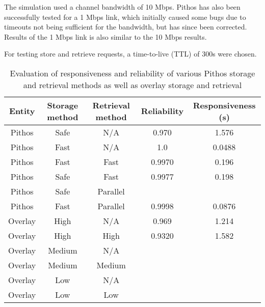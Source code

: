 The simulation used a channel bandwidth of 10 Mbps. Pithos has also been successfully tested for a 1 Mbps link, which initially caused some bugs due to timeouts not being sufficient for the bandwidth, but has since been corrected. Results of the 1 Mbps link is also similar to the 10 Mbps results.

For testing store and retrieve requests, a time-to-live (TTL) of 300s were chosen.

\begin{table}[htbp]
\centering
\begin{tabular}{|c|c|c|c|c|}
\hline
Entity & Storage method & Retrieval method & Reliability & Responsiveness (s)\\
\hline
Pithos  &   Safe    &   N/A         &   0.970   &   1.576\\
Pithos  &   Fast    &   N/A         &   1.0     &   0.0488\\
Pithos  &   Fast    &   Fast        &   0.9970  &   0.196\\
Pithos  &   Safe    &   Fast        &   0.9977  &   0.198\\
Pithos  &   Safe    &   Parallel    &           &        \\
Pithos  &   Fast    &   Parallel    &   0.9998  &   0.0876\\
\hline
Overlay &   High    &   N/A         &   0.969   &   1.214  \\
Overlay &   High    &   High        &   0.9320  &   1.582  \\
Overlay &   Medium  &   N/A         &           &          \\
Overlay &   Medium  &   Medium      &           &         \\
Overlay &   Low     &   N/A         &           &         \\
Overlay &   Low     &   Low         &           &         \\
\hline
\end{tabular}
\caption{Evaluation of responsiveness and reliability of various Pithos storage and retrieval methods as well as overlay storage and retrieval}
\label{tab_rel_resp_results}
\end{table}

